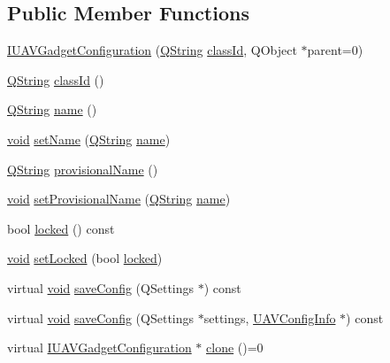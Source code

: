 \subsection*{\-Public \-Member \-Functions}
\begin{DoxyCompactItemize}
\item 
\hyperlink{group___core_plugin_gacdfdf0b1e39b5002472b76b6564ce51f}{\-I\-U\-A\-V\-Gadget\-Configuration} (\hyperlink{group___u_a_v_objects_plugin_gab9d252f49c333c94a72f97ce3105a32d}{\-Q\-String} \hyperlink{group___core_plugin_gac953657221ba7fda967ada0408332641}{class\-Id}, \-Q\-Object $\ast$parent=0)
\item 
\hyperlink{group___u_a_v_objects_plugin_gab9d252f49c333c94a72f97ce3105a32d}{\-Q\-String} \hyperlink{group___core_plugin_gac953657221ba7fda967ada0408332641}{class\-Id} ()
\item 
\hyperlink{group___u_a_v_objects_plugin_gab9d252f49c333c94a72f97ce3105a32d}{\-Q\-String} \hyperlink{group___core_plugin_ga644f51fd4e29830095d2e70735fa78e9}{name} ()
\item 
\hyperlink{group___u_a_v_objects_plugin_ga444cf2ff3f0ecbe028adce838d373f5c}{void} \hyperlink{group___core_plugin_ga8e4586ac1d5e24939892e82329c31088}{set\-Name} (\hyperlink{group___u_a_v_objects_plugin_gab9d252f49c333c94a72f97ce3105a32d}{\-Q\-String} \hyperlink{group___core_plugin_ga644f51fd4e29830095d2e70735fa78e9}{name})
\item 
\hyperlink{group___u_a_v_objects_plugin_gab9d252f49c333c94a72f97ce3105a32d}{\-Q\-String} \hyperlink{group___core_plugin_gae9603b84d30a99df5d2f21ad4f578488}{provisional\-Name} ()
\item 
\hyperlink{group___u_a_v_objects_plugin_ga444cf2ff3f0ecbe028adce838d373f5c}{void} \hyperlink{group___core_plugin_gadb0e3941af5a10dd466f1de72e39d9b3}{set\-Provisional\-Name} (\hyperlink{group___u_a_v_objects_plugin_gab9d252f49c333c94a72f97ce3105a32d}{\-Q\-String} \hyperlink{group___core_plugin_ga644f51fd4e29830095d2e70735fa78e9}{name})
\item 
bool \hyperlink{group___core_plugin_ga3e1a13f5823a638abfeedbde21a72027}{locked} () const 
\item 
\hyperlink{group___u_a_v_objects_plugin_ga444cf2ff3f0ecbe028adce838d373f5c}{void} \hyperlink{group___core_plugin_gae177a35baac59cd8d80598db6103bb70}{set\-Locked} (bool \hyperlink{group___core_plugin_ga3e1a13f5823a638abfeedbde21a72027}{locked})
\item 
virtual \hyperlink{group___u_a_v_objects_plugin_ga444cf2ff3f0ecbe028adce838d373f5c}{void} \hyperlink{group___core_plugin_gadd755520091c21c0ce09973c5bbdb7a9}{save\-Config} (\-Q\-Settings $\ast$) const 
\item 
virtual \hyperlink{group___u_a_v_objects_plugin_ga444cf2ff3f0ecbe028adce838d373f5c}{void} \hyperlink{group___core_plugin_gaabed0a41d7c153bb0b7e03486125bb42}{save\-Config} (\-Q\-Settings $\ast$settings, \hyperlink{class_core_1_1_u_a_v_config_info}{\-U\-A\-V\-Config\-Info} $\ast$) const 
\item 
virtual \hyperlink{class_core_1_1_i_u_a_v_gadget_configuration}{\-I\-U\-A\-V\-Gadget\-Configuration} $\ast$ \hyperlink{group___core_plugin_ga35f72dc89919925fd591fa509ebbf7dc}{clone} ()=0
\end{DoxyCompactItemize}


